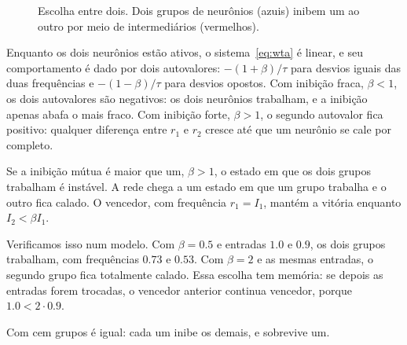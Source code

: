 \begin{figure}[t]
\centering
{}
\caption{Escolha entre dois. Dois grupos de neurônios  (azuis) inibem um ao outro por meio de intermediários  (vermelhos).}
\label{fig:wta}
\end{figure}

Enquanto os dois neurônios estão ativos, o sistema~\eqref{eq:wta} é linear, e seu comportamento é dado por dois autovalores: $-(1+\beta)/\tau$ para desvios iguais das duas frequências e $-(1-\beta)/\tau$ para desvios opostos. Com inibição fraca, $\beta<1$, os dois autovalores são negativos: os dois neurônios trabalham, e a inibição apenas abafa o mais fraco. Com inibição forte, $\beta>1$, o segundo autovalor fica positivo: qualquer diferença entre $r_1$ e $r_2$ cresce até que um neurônio se cale por completo.

\begin{keyblock}
\begin{proposition}
\label{prop:wta}
Se a inibição mútua é maior que um, $\beta>1$, o estado em que os dois grupos trabalham é instável. A rede chega a um estado em que um grupo trabalha e o outro fica calado. O vencedor, com frequência $r_1=I_1$, mantém a vitória enquanto $I_2<\beta I_1$.
\end{proposition}
\end{keyblock}

Verificamos isso num modelo. Com $\beta=0.5$ e entradas $1.0$ e $0.9$, os dois grupos trabalham, com frequências $0.73$ e $0.53$. Com $\beta=2$ e as mesmas entradas, o segundo grupo fica totalmente calado. Essa escolha tem memória: se depois as entradas forem trocadas, o vencedor anterior continua vencedor, porque $1.0<2\cdot0.9$.

Com cem grupos é igual: cada um inibe os demais, e sobrevive um.

